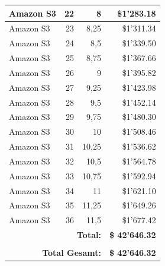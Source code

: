 \begin{table}
\begin{center}
\begin{tabular}{|l|r|r|r|}
Amazon S3 & 22 & 8 & \$1'283.18 \\ \hline
Amazon S3 & 23 & 8,25 & \$1'311.34 \\ \hline
Amazon S3 & 24 & 8,5 & \$1'339.50 \\ \hline
Amazon S3 & 25 & 8,75 & \$1'367.66 \\ \hline
Amazon S3 & 26 & 9 & \$1'395.82 \\ \hline
Amazon S3 & 27 & 9,25 & \$1'423.98 \\ \hline
Amazon S3 & 28 & 9,5 & \$1'452.14 \\ \hline
Amazon S3 & 29 & 9,75 & \$1'480.30 \\ \hline
Amazon S3 & 30 & 10 & \$1'508.46 \\ \hline
Amazon S3 & 31 & 10,25 & \$1'536.62 \\ \hline
Amazon S3 & 32 & 10,5 & \$1'564.78 \\ \hline
Amazon S3 & 33 & 10,75 & \$1'592.94 \\ \hline
Amazon S3 & 34 & 11 & \$1'621.10 \\ \hline
Amazon S3 & 35 & 11,25 & \$1'649.26 \\ \hline
Amazon S3 & 36 & 11,5 & \$1'677.42 \\ \hline
\multicolumn{3}{r|}{\textbf{Total:}} & \textbf{\$ 42'646.32} \\ \cline{4-4}
\multicolumn{4}{c}{} \\ \cline{4-4}
\multicolumn{3}{r|}{\textbf{Total Gesamt:}} & \textbf{ \$ 42'646.32} \\ \cline{4-4}
\end{tabular}
\end{center}
\label{tab:KostenAmazonS3S1}
\end{table}

